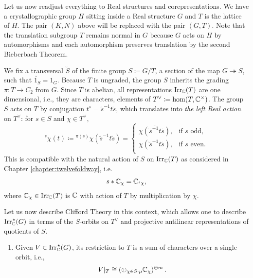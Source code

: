 Let us now readjust everything to Real structures and corepresentations. We have a crystallographic group $H$ sitting inside a Real structure $G$ and $T$ is the lattice of $H$. The pair $(K,N)$ above will be replaced with the pair $(G,T)$. Note that the translation subgroup $T$ remains normal in $G$ because $G$ acts on $H$ by automorphisms and each automorphism preserves translation by the second Bieberbach Theorem.

We fix a transversal $\breve{S}$ of the finite group $S \coloneqq G/T$, a section of the map $G \twoheadrightarrow S$, such that $\breve{1_S} = 1_G$. Because $T$ is ungraded, the group $S$ inherits the grading $\pi : T \to C_2$ from $G$.
Since $T$ is abelian, all representations ${\operatorname{Irr}_{{\mathbb C}}(T)}$ are one dimensional, i.e.,
they are characters, elements of $T^\vee \coloneqq \hom (T,{\mathbb C}^\times)$.
The group $S$ acts on $T$ by conjugation $t^s = \breve{s}^{-1} t \breve{s}$,
which translates into {\em the left Real action} on $T^\vee$: for $s\in S$ and $\chi\in T^\vee$,
\begin{equation} \label{Cliff_2a}
{}^{s}\chi (t)  \coloneqq {}^{\pi (s)} \chi (\breve{s}^{-1}t\breve{s}) = \begin{cases}
    \overline{\chi (\breve{s}^{-1}t\breve{s})}  , & \text{if $s$ odd,}\\
    \chi (\breve{s}^{-1}t\breve{s}) , & \text{if $s$ even.}\\
    \end{cases}
  \end{equation}  
This is compatible with the natural action of $S$ on $\operatorname{Irr}_{{\mathbb C}}(T)$ as considered in Chapter \ref{chapter:twelvefoldway}, i.e.
\[
  s * {\mathbb C}_{\chi} = {\mathbb C}_{{}^{s} \chi},
\]
where ${\mathbb C}_{\chi} \in \operatorname{Irr}_{{\mathbb C}}(T)$ is ${\mathbb C}$ with action of $T$ by multiplication by $\chi$.

Let us now describe Clifford Theory in this context, which allows one to describe ${\operatorname{Irr}_{{\mathbb C}}^{\hspace{0.1em} \star}(G)}$ in terms of the $S$-orbits on $T^\vee$ and projective antilinear representations of quotients of $S$.

  \begin{enumerate}[resume, label=\textnormal{(\Roman*)}]
  \item Given $V\in {\operatorname{Irr}_{{\mathbb C}}^{\hspace{0.1em} \star}(G)}$, its restriction to $T$ is a sum of characters over a single orbit, i.e.,
\begin{equation} \label{Cliff_2b}
  V|_T \cong (\oplus_{\chi \in S \cdot \mu} {\mathbb C}_\chi) ^{\oplus m}\, .
\end{equation}
\end{enumerate}

